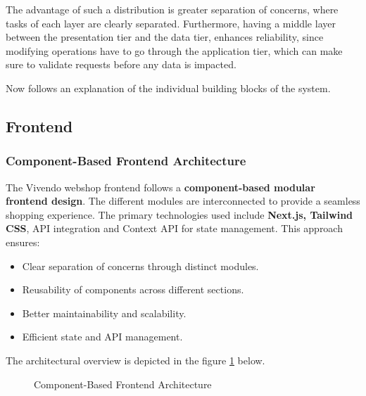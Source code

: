 The advantage of such a distribution is greater separation of concerns,
where tasks of each layer are clearly separated.
Furthermore, having a middle layer between the presentation tier and the data tier,
enhances reliability, since modifying operations have to go through the
application tier, which can make sure to validate requests before any data is impacted.


Now follows an explanation of the individual building blocks of the system.
\subsection{Frontend}
\subsubsection{Component-Based Frontend Architecture}
The Vivendo webshop frontend follows a \textbf{component-based modular frontend design}. The different modules are interconnected to provide a seamless shopping experience. The primary technologies used include \textbf{Next.js, Tailwind CSS}, API integration and Context API for state management. This approach ensures:
\begin{itemize}
    \item Clear separation of concerns through distinct modules.
    \item Reusability of components across different sections.
    \item Better maintainability and scalability.
    \item Efficient state and API management.
\end{itemize}
The architectural overview is depicted in the figure \ref{fig:architecture} below.

\begin{figure}[H]
    \centering
    \caption{Component-Based Frontend Architecture}
    \label{fig:architecture}
  \end{figure}  

